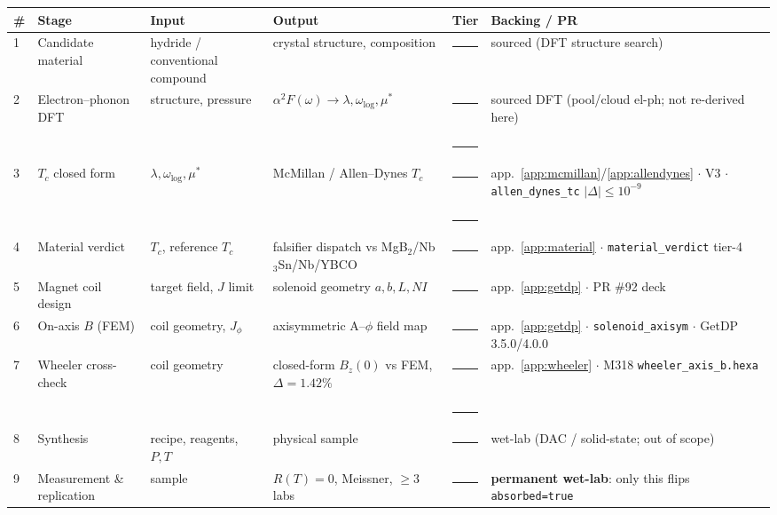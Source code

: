 \documentclass[11pt,a4paper]{article}
\newcommand{\tierdisc}[1]{\textcolor{#1}{\rule[0.05ex]{1.0ex}{1.0ex}}}
\newcommand{\tierBlue}{\tierdisc{blue!70!black}}
\newcommand{\tierGreen}{\tierdisc{green!60!black}}
\newcommand{\tierYellow}{\tierdisc{yellow!85!black}}
\newcommand{\tierOrange}{\tierdisc{orange!90!black}}
\begin{document}
\medskip
\begin{table}[h]
\centering
\scriptsize
\setlength{\tabcolsep}{4pt}
\begin{tabular}{@{}>{\centering\arraybackslash}m{0.3cm} >{\raggedright\arraybackslash}m{2.0cm} >{\raggedright\arraybackslash}m{2.7cm} >{\raggedright\arraybackslash}m{2.7cm} >{\centering\arraybackslash}m{0.55cm} >{\raggedright\arraybackslash}m{4.0cm}@{}}
\toprule
\textbf{\#} & \textbf{Stage} & \textbf{Input} & \textbf{Output} & \textbf{Tier} & \textbf{Backing / PR} \\
\midrule
\textcircled{\scriptsize 1} & Candidate material & hydride / conventional compound & crystal structure, composition & \tierYellow & sourced (DFT structure search) \\
\textcircled{\scriptsize 2} & Electron--phonon DFT & structure, pressure & $\alpha^2F(\omega)\!\to\!\lambda,\omega_{\log},\mu^{*}$ & \tierYellow\,\tierOrange & sourced DFT (pool/cloud el-ph; not re-derived here) \\
\textcircled{\scriptsize 3} & $T_c$ closed form & $\lambda,\omega_{\log},\mu^{*}$ & McMillan / Allen--Dynes $T_c$ & \tierGreen\,\tierBlue & app.~\ref{app:mcmillan}/\ref{app:allendynes} $\cdot$ V3 $\cdot$ \texttt{allen\_dynes\_tc} $|\Delta|\!\le\!10^{-9}$ \\
\textcircled{\scriptsize 4} & Material verdict & $T_c$, reference $T_c$ & falsifier dispatch vs MgB$_2$/Nb$_3$Sn/Nb/YBCO & \tierGreen & app.~\ref{app:material} $\cdot$ \texttt{material\_verdict} tier-4 \\
\textcircled{\scriptsize 5} & Magnet coil design & target field, $J$ limit & solenoid geometry $a,b,L,NI$ & \tierBlue & app.~\ref{app:getdp} $\cdot$ PR \#92 deck \\
\textcircled{\scriptsize 6} & On-axis $B$ (FEM) & coil geometry, $J_\phi$ & axisymmetric A--$\phi$ field map & \tierGreen & app.~\ref{app:getdp} $\cdot$ \texttt{solenoid\_axisym} $\cdot$ GetDP 3.5.0/4.0.0 \\
\textcircled{\scriptsize 7} & Wheeler cross-check & coil geometry & closed-form $B_z(0)$ vs FEM, $\Delta\!=\!1.42\%$ & \tierGreen\,\tierBlue & app.~\ref{app:wheeler} $\cdot$ M318 \texttt{wheeler\_axis\_b.hexa} \\
\textcircled{\scriptsize 8} & Synthesis & recipe, reagents, $P,T$ & physical sample & \tierOrange & wet-lab (DAC / solid-state; out of scope) \\
\textcircled{\scriptsize 9} & Measurement \& replication & sample & $R(T)\!=\!0$, Meissner, $\ge\!3$ labs & \tierOrange & \textbf{permanent wet-lab}: only this flips \texttt{absorbed=true} \\

\end{tabular}
\end{table}
\end{document}
